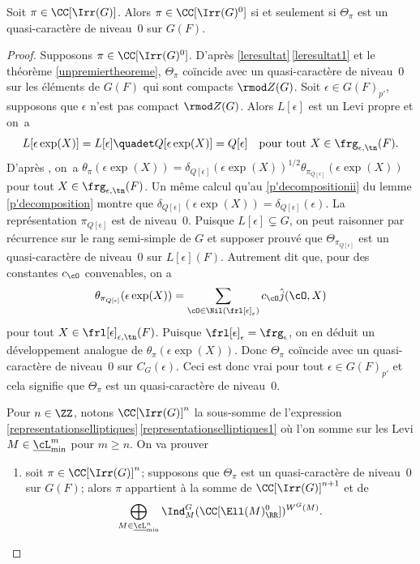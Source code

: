 \label{caracterisation}

\begin{thm*}
Soit $\pi\in \CC[\Irr(G)]$. Alors $\pi\in \CC[\Irr(G)^0]$ si et seulement si $\Theta_{\pi}$ est un quasi-caractère de niveau~$0$ sur $G(F)$.
\end{thm*}

\begin{proof}
Supposons $\pi\in \CC[\Irr(G)^0]$. D'après \ref{leresultat}\,\eqref{leresultat1} et le théorème \ref{unpremiertheoreme}, $\Theta_{\pi}$ coïncide avec un quasi-caractère de niveau~$0$ sur les éléments de $G(F)$ qui sont compacts $\rmod Z(G)$. Soit $\epsilon\in G(F)_{p'}$, supposons que $\epsilon$ n'est pas compact $\rmod Z(G)$. Alors $L[\epsilon]$ est un Levi propre et on~a
\[
L[\epsilon \exp(X)]=L[\epsilon]\quadet Q[\epsilon \exp(X)]=Q[\epsilon]\quad \text{pour tout }X\in \frg_{\epsilon,\tn}(F).
\]
D'après \cite[Th.\,5.2]{C}, on~a $\theta_{\pi}(\epsilon \exp(X))=\delta_{Q[\epsilon]}(\epsilon \exp(X))^{1/2}\theta_{\pi_{Q[\epsilon]}}(\epsilon \exp(X))$ pour tout $X\in \frg_{\epsilon,\tn}(F)$. Un même calcul qu'au \eqref{p'decompositionii} du lemme \ref{p'decomposition} montre que $\delta_{Q[\epsilon]}(\epsilon \exp(X))=\delta_{Q[\epsilon]}(\epsilon)$. La représentation $\pi_{Q[\epsilon]}$ est de niveau~$0$. Puisque $L[\epsilon]\subsetneq G$, on peut raisonner par récurrence sur le rang semi-simple de $G$ et supposer prouvé que $\Theta_{\pi_{Q[\epsilon]}}$ est un quasi-caractère de niveau~$0$ sur $L[\epsilon](F)$. Autrement dit que, pour des constantes $c_{\cO}$ convenables, on a
\[
\theta_{\pi_{Q[\epsilon]}}(\epsilon \exp(X))=\sum_{\cO\in \Nil(\frl[\epsilon]_{\epsilon})}c_{\cO}\hat{j}(\cO,X)
\]
pour tout $X\in \frl[\epsilon]_{\epsilon,\tn}(F)$. Puisque $\frl[\epsilon]_{\epsilon}=\frg_{\epsilon}$, on en déduit un développement analogue de $\theta_{\pi}(\epsilon \exp(X))$. Donc $\Theta_{\pi}$ coïncide avec un quasi-caractère de niveau~$0$ sur $C_{G}(\epsilon)$. Ceci est donc vrai pour tout $\epsilon\in G(F)_{p'}$ et cela signifie que $\Theta_{\pi}$ est un quasi-caractère de niveau~$0$.

Pour $n\in \ZZ$, notons $\CC[\Irr(G)]^n$ la sous-somme de l'expression \ref{representationselliptiques}\,\eqref{representationselliptiques1} où l'on somme sur les Levi $M\in \underline{\cL}^m_{\min}$ pour $m\geq n$. On va prouver
\begin{enumerate}
\item\label{caracterisation1}
soit $\pi\in \CC[\Irr(G)]^n$; supposons que $\Theta_{\pi}$ est un quasi-caractère de niveau~$0$ sur $G(F)$; alors $\pi$ appartient à la somme de $\CC[\Irr(G)]^{n+1}$ et de
\[
\bigoplus_{M\in \underline{\cL}^n_{\min}}\Ind_{M}^G(\CC[\Ell(M)_{\RR}^0])^{W^G(M)}.
\]
\end{enumerate}


\end{proof}
